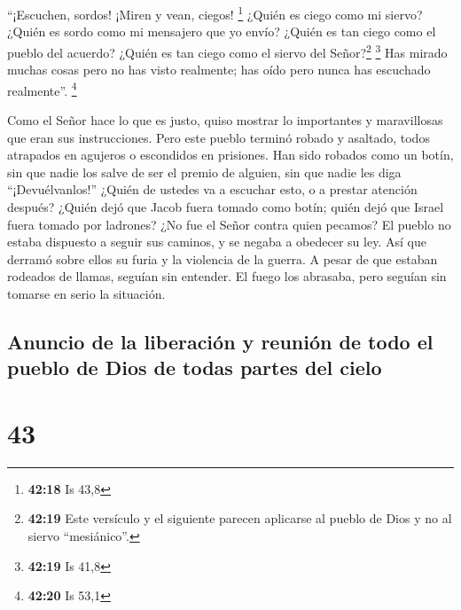  ``¡Escuchen, sordos! ¡Miren y vean, ciegos! \footnote{\textbf{42:18}
  Is 43,8}  ¿Quién es ciego como mi siervo? ¿Quién es
sordo como mi mensajero que yo envío? ¿Quién es tan ciego como el pueblo
del acuerdo? ¿Quién es tan ciego como el siervo del Señor?\footnote{\textbf{42:19}
  Este versículo y el siguiente parecen aplicarse al pueblo de Dios y no
  al siervo ``mesiánico''.} \footnote{\textbf{42:19} Is 41,8}
 Has mirado muchas cosas pero no has visto realmente; has
oído pero nunca has escuchado realmente''. \footnote{\textbf{42:20} Is
  53,1}

 Como el Señor hace lo que es justo, quiso mostrar lo
importantes y maravillosas que eran sus instrucciones. 
Pero este pueblo terminó robado y asaltado, todos atrapados en agujeros
o escondidos en prisiones. Han sido robados como un botín, sin que nadie
los salve de ser el premio de alguien, sin que nadie les diga
``¡Devuélvanlos!''  ¿Quién de ustedes va a escuchar esto,
o a prestar atención después?  ¿Quién dejó que Jacob
fuera tomado como botín; quién dejó que Israel fuera tomado por
ladrones? ¿No fue el Señor contra quien pecamos? El pueblo no estaba
dispuesto a seguir sus caminos, y se negaba a obedecer su ley.
 Así que derramó sobre ellos su furia y la violencia de
la guerra. A pesar de que estaban rodeados de llamas, seguían sin
entender. El fuego los abrasaba, pero seguían sin tomarse en serio la
situación.

\hypertarget{anuncio-de-la-liberaciuxf3n-y-reuniuxf3n-de-todo-el-pueblo-de-dios-de-todas-partes-del-cielo}{%
\subsection{Anuncio de la liberación y reunión de todo el pueblo de Dios
de todas partes del
cielo}\label{anuncio-de-la-liberaciuxf3n-y-reuniuxf3n-de-todo-el-pueblo-de-dios-de-todas-partes-del-cielo}}

\hypertarget{section-42}{%
\section{43}\label{section-42}}

